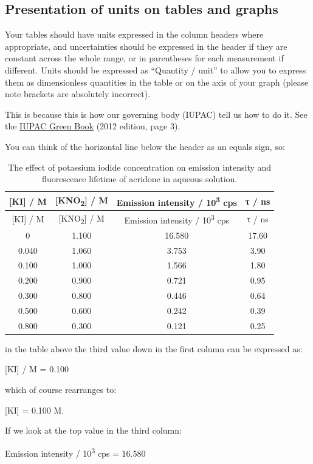 \documentclass[
]{book}
\begin{document}
\hypertarget{subsec:units}{%
\subsection{Presentation of units on tables and graphs}\label{subsec:units}}

Your tables should have units expressed in the column headers where appropriate, and uncertainties should be expressed in the header if they are constant across the whole range, or in parentheses for each measurement if different. Units should be expressed as ``Quantity / unit'' to allow you to express them as dimensionless quantities in the table or on the axis of your graph (please note brackets are absolutely incorrect).

This is because this is how our governing body (IUPAC) tell us how to do it. See the \href{https://iupac.org/wp-content/uploads/2019/05/IUPAC-GB3-2012-2ndPrinting-PDFsearchable.pdf}{IUPAC Green Book} (2012 edition, page 3).

You can think of the horizontal line below the header as an equals sign, so:

\begin{longtable}[]{@{}cccc@{}}
\caption{\label{tab:acridonequench} The effect of potassium iodide concentration on emission intensity and fluorescence lifetime of acridone in aqueous solution.}\tabularnewline
\toprule
{[}KI{]} / M & {[}KNO\textsubscript{2}{]} / M & Emission intensity / 10\textsuperscript{3} cps & τ / ns\tabularnewline
\midrule
\endfirsthead
\toprule
{[}KI{]} / M & {[}KNO\textsubscript{2}{]} / M & Emission intensity / 10\textsuperscript{3} cps & τ / ns\tabularnewline
\midrule
\endhead
0 & 1.100 & 16.580 & 17.60\tabularnewline
0.040 & 1.060 & 3.753 & 3.90\tabularnewline
0.100 & 1.000 & 1.566 & 1.80\tabularnewline
0.200 & 0.900 & 0.721 & 0.95\tabularnewline
0.300 & 0.800 & 0.446 & 0.64\tabularnewline
0.500 & 0.600 & 0.242 & 0.39\tabularnewline
0.800 & 0.300 & 0.121 & 0.25\tabularnewline
\bottomrule
\end{longtable}

in the table above the third value down in the first column can be expressed as:

{[}KI{]} / M = 0.100

which of course rearranges to:

{[}KI{]} = 0.100 M.

If we look at the top value in the third column:

Emission intensity / 10\textsuperscript{3} cps = 16.580
\end{document}
